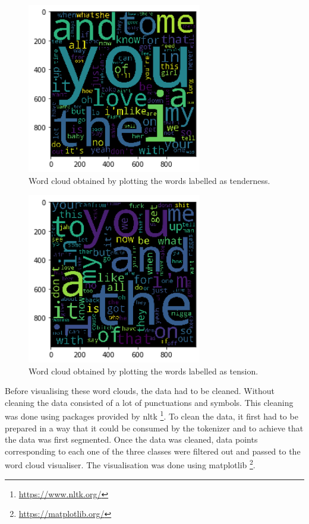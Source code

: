 \documentclass[11pt,a4paper]{article}
\begin{document}
\begin{figure}[htb]
  \begin{center}
  \includegraphics[width=3in]{4_tenderness.png}
  \caption{Word cloud obtained by plotting the words labelled as tenderness.}
  \label{tenderness}
  \end{center}
\end{figure}

\begin{figure}[htb]
  \begin{center}
  \includegraphics[width=3in]{5_tension.png}
  \caption{Word cloud obtained by plotting the words labelled as tension.}
  \label{tension}
  \end{center}
\end{figure}

Before visualising these word clouds, the data had to be cleaned. Without cleaning the data consisted of a lot of punctuations and symbols. This cleaning was done using packages provided by nltk \footnote{\url{https://www.nltk.org/}}. To clean the data, it first had to be prepared in a way that it could be consumed by the tokenizer and to achieve that the data was first segmented. Once the data was cleaned, data points corresponding to each one of the three classes were filtered out and passed to the word cloud visualiser. The visualisation was done using matplotlib \footnote{\url{https://matplotlib.org/}}.
\end{document}
